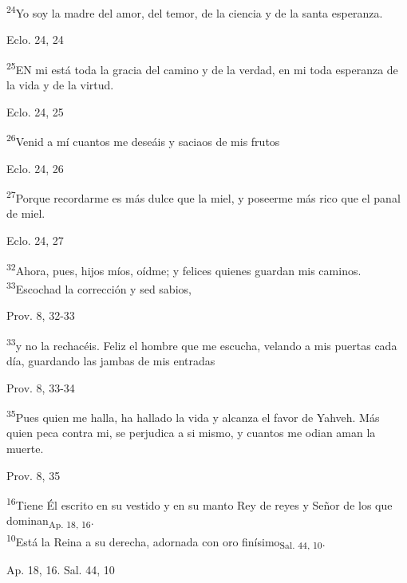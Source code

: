 \documentclass[a4paper,11pt]{article}
\begin{document}
      \textsuperscript{24}Yo soy la madre del amor, del temor, de la ciencia y de la santa esperanza.
      \begin{flushright}
        Eclo. 24, 24
      \end{flushright}

      \textsuperscript{25}EN mi está toda la gracia del camino y de la verdad, en mi toda esperanza de la vida y de la virtud.
      \begin{flushright}
        Eclo. 24, 25
      \end{flushright}

      \textsuperscript{26}Venid a mí cuantos me deseáis y saciaos de mis frutos
      \begin{flushright}
        Eclo. 24, 26
      \end{flushright}

      \textsuperscript{27}Porque recordarme es más dulce que la miel, y poseerme más rico que el panal de miel.
      \begin{flushright}
        Eclo. 24, 27
      \end{flushright}

      \textsuperscript{32}Ahora, pues, hijos míos, oídme; y felices quienes guardan mis caminos. \textsuperscript{33}Escochad la corrección y sed sabios,
      \begin{flushright}
        Prov. 8, 32-33
      \end{flushright}

      \textsuperscript{33}y no la rechacéis. Feliz el hombre que me escucha, velando a mis puertas cada día,
      guardando las jambas de mis entradas
      \begin{flushright}
        Prov. 8, 33-34
      \end{flushright}

      \textsuperscript{35}Pues quien me halla, ha hallado la vida y alcanza el favor de Yahveh. Más quien peca contra mi, se perjudica a si mismo,
      y cuantos me odian aman la muerte.
      \begin{flushright}
        Prov. 8, 35
      \end{flushright}

      \textsuperscript{16}Tiene Él escrito en su vestido y en su manto Rey de reyes y Señor de los que dominan\textsubscript{Ap. 18, 16}.  \\
      \textsuperscript{10}Está la Reina a su derecha, adornada con oro finísimo\textsubscript{Sal. 44, 10}.
      \begin{flushright}
        Ap. 18, 16. Sal. 44, 10
      \end{flushright}
\end{document}
